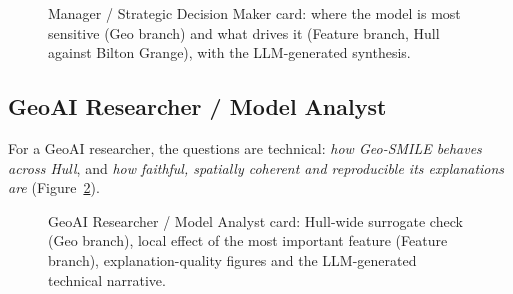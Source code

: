 \begin{figure}[H]
\def\cardcontent{\begin{tcolorbox}[stakecard]
\setlength{\parskip}{0pt}\raggedright%
{\color{cardMuted}What drives the model, where it is sensitive, and what can be set aside}\par\vspace{4pt}
\cardpair{01 \textperiodcentered{} Most sensitive areas}{Chapter6/figs/dashboard_manager_short_E01033104_1.png}
  {02 \textperiodcentered{} What drives the model}{Chapter6/figs/dashboard_manager_short_E01033104_2.png}
  {Drivers and exceptions}{\cardSecA}
  {What can be set aside, and confidence}{\cardSecB}
\vspace{5pt}
\cardtiles
\cardfoot{\cardFooter{} Map 01: Geo branch. Panel 02: Feature branch, share of local importance,
not an effect on crime.}
\end{tcolorbox}}
\caption{Manager / Strategic Decision Maker card: where the model is most sensitive (Geo branch)
and what drives it (Feature branch, Hull against Bilton Grange), with the LLM-generated synthesis.}
\label{fig:stakeholder-manager}
\end{figure}


\clearpage

\subsection{GeoAI Researcher / Model Analyst}
For a GeoAI researcher, the questions are technical: \emph{how Geo-SMILE behaves across Hull},
and \emph{how faithful, spatially coherent and reproducible its explanations are}
(Figure~\ref{fig:stakeholder-researcher}).\par\medskip
\def\cardtilegroup{researchertiles}
\measurecard

\begin{figure}[H]
\def\cardcontent{\begin{tcolorbox}[stakecard]
\setlength{\parskip}{0pt}\raggedright%
{\color{cardMuted}How Geo-SMILE behaves across Hull, and how far its explanations can be trusted}\par\vspace{4pt}
\cardpair{01 \textperiodcentered{} Surrogate against exact masking}{Chapter6/figs/dashboard_researcher_short_hull_1.png}
  {02 \textperiodcentered{} Top feature, local effect}{Chapter6/figs/dashboard_researcher_short_hull_2.png}
  {Explanation behaviour across Hull}{\cardSecA}
  {Fidelity, intervention and reproducibility}{\cardSecB}
\vspace{5pt}
\cardtiles
\cardfoot{\cardFooter{} Panels are the dashboard's Hull-wide researcher view.}
\end{tcolorbox}}
\caption{GeoAI Researcher / Model Analyst card: Hull-wide surrogate check (Geo branch), local
effect of the most important feature (Feature branch), explanation-quality figures and the
LLM-generated technical narrative.}
\label{fig:stakeholder-researcher}
\end{figure}


